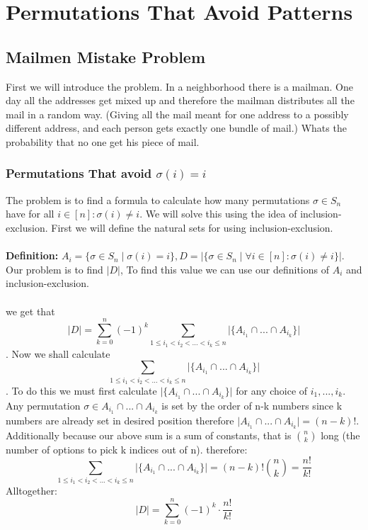 \documentclass{article}
\begin{document}
\section{Permutations That Avoid Patterns}
\subsection{Mailmen Mistake Problem}
First we will introduce the problem. In a neighborhood there is a mailman. One day all the addresses get mixed up and therefore the mailman distributes all the mail in a random way. (Giving all the mail meant for one address to a possibly different address, and each person gets exactly one bundle of mail.) Whats the probability that no one get his piece of mail.
\\
\subsubsection{Permutations That avoid $\sigma (i)=i$}
The problem is to find a formula to calculate how many permutations $\sigma \in S_n$ have for all $i \in [n]:  \sigma(i) \neq i$. We will solve this using the idea of inclusion-exclusion. First we will define the natural sets for using inclusion-exclusion. \\ \\
\textbf{Definition:}
$A_i=\{\sigma \in S_n\mid\sigma(i)=i\},D=\vert \{\sigma \in S_n\mid \forall i \in [n]: \sigma(i) \neq i\} \vert$.\\
Our problem is to find $\vert D\vert$, To find this value we can use our definitions of $A_i$ and inclusion-exclusion.\\ \\ we get that \[\vert D\vert = \sum_{k=0}^{n} (-1)^{k}\sum_{1\leq i_1<  i_2 <...< i_k\leq n} \vert\{A_{i_1} \cap...\cap A_{i_k}\}\vert \]. 
Now we shall calculate \[\sum_{1\leq i_1<  i_2 <...< i_k\leq n} \vert\{A_{i_1} \cap...\cap A_{i_k}\}\vert\].
To do this we must first calculate $\vert\{A_{i_1} \cap...\cap A_{i_k}\}\vert$ for any choice of $i_1,...,i_k$.\\
Any permutation $\sigma \in A_{i_1}\cap...\cap A_{i_k}$ is set by the order of n-k numbers since k numbers are already set in desired position therefore $\vert A_{i_1}\cap ...\cap A_{i_k}\vert = (n-k)!$. Additionally because our above sum is a sum of constants, that is $\binom{n}{k}$ long (the number of options to pick k indices out of n). therefore: 
\[\sum_{1\leq i_1<  i_2 <...< i_k\leq n} \vert\{A_{i_1} \cap...\cap A_{i_k}\}\vert = (n-k)! \binom{n}{k} = \frac{n!}{k!}\]Alltogether: 
\[\vert D \vert = \sum_{k=0}^{n} (-1)^k \cdot\frac{n!}{k!}\]
\end{document}
